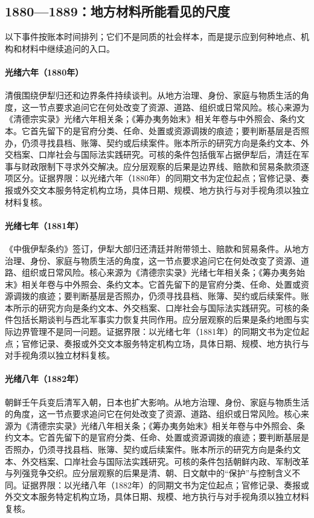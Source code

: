 \subsection{1880—1889：地方材料所能看见的尺度}
以下事件按账本时间排列；它们不是同质的社会样本，而是提示应到何种地点、机构和材料中继续追问的入口。
\hypertarget{social:EQ-1880-ILI-NEGOTIATIONS}{}\paragraph{光绪六年（1880年）}清俄围绕伊犁归还和边界条件持续谈判。从地方治理、身份、家庭与物质生活的角度，这一节点要求追问它在何处改变了资源、道路、组织或日常风险。核心来源为《清德宗实录》光绪六年相关条；《筹办夷务始末》相关年卷与中外照会、条约文本。它首先留下的是官府分类、任命、处置或资源调拨的痕迹；要判断基层是否照办，仍须寻找县档、账簿、契约或后续案件。账本所示的研究方向是条约文本、外交档案、口岸社会与国际法实践研究。可核的条件包括俄军占据伊犁后，清廷在军事与财政限制下寻求外交解决。应分层观察的后果是边界线、赔款和贸易条款须逐项区分。证据界限：以光绪六年（1880年）的同期文书为定位起点；官修记录、奏报或外交文本服务特定机构立场，具体日期、规模、地方执行与对手视角须以独立材料复核。
\hypertarget{social:EQ-1881-SAINT-PETERSBURG-TREATY}{}\paragraph{光绪七年（1881年）}《中俄伊犁条约》签订，伊犁大部归还清廷并附带领土、赔款和贸易条件。从地方治理、身份、家庭与物质生活的角度，这一节点要求追问它在何处改变了资源、道路、组织或日常风险。核心来源为《清德宗实录》光绪七年相关条；《筹办夷务始末》相关年卷与中外照会、条约文本。它首先留下的是官府分类、任命、处置或资源调拨的痕迹；要判断基层是否照办，仍须寻找县档、账簿、契约或后续案件。账本所示的研究方向是条约文本、外交档案、口岸社会与国际法实践研究。可核的条件包括长期谈判与西北军事实力恢复共同作用。应分层观察的后果是条约地图与实际边界管理不是同一问题。证据界限：以光绪七年（1881年）的同期文书为定位起点；官修记录、奏报或外交文本服务特定机构立场，具体日期、规模、地方执行与对手视角须以独立材料复核。
\hypertarget{social:EQ-1882-IMO-INCIDENT}{}\paragraph{光绪八年（1882年）}朝鲜壬午兵变后清军入朝，日本也扩大影响。从地方治理、身份、家庭与物质生活的角度，这一节点要求追问它在何处改变了资源、道路、组织或日常风险。核心来源为《清德宗实录》光绪八年相关条；《筹办夷务始末》相关年卷与中外照会、条约文本。它首先留下的是官府分类、任命、处置或资源调拨的痕迹；要判断基层是否照办，仍须寻找县档、账簿、契约或后续案件。账本所示的研究方向是条约文本、外交档案、口岸社会与国际法实践研究。可核的条件包括朝鲜内政、军制改革与列强竞争交织。应分层观察的后果是清、朝、日文献中的“保护”与控制含义不同。证据界限：以光绪八年（1882年）的同期文书为定位起点；官修记录、奏报或外交文本服务特定机构立场，具体日期、规模、地方执行与对手视角须以独立材料复核。

